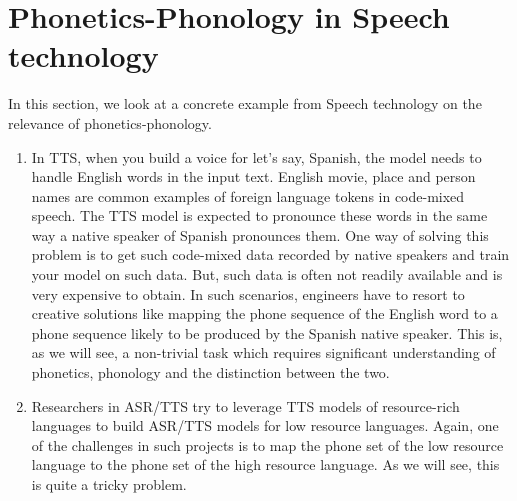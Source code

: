 \documentclass{article}
\begin{document}
\section{Phonetics-Phonology in Speech technology}

In this section, we look at a concrete example from Speech technology on the relevance of phonetics-phonology.
\begin{enumerate}
    \item In TTS, when you build a voice for let's say, Spanish, the model needs to handle English words in the input text. English movie, place and person names are common examples of foreign language tokens in code-mixed speech. The TTS model is expected to pronounce these words in the same way a native speaker of Spanish pronounces them. One way of solving this problem is to get such code-mixed data recorded by native speakers and train your model on such data. But, such data is often not readily available and is very expensive to obtain. In such scenarios, engineers have to resort to creative solutions like mapping the phone sequence of the English word to a phone sequence likely to be produced by the Spanish native speaker. This is, as we will see, a non-trivial task which requires significant understanding of phonetics, phonology and the distinction between the two.
    \item Researchers in ASR/TTS try to leverage TTS models of resource-rich languages to build ASR/TTS models for low resource languages. Again, one of the challenges in such projects is to map the phone set of the low resource language to the phone set of the high resource language. As we will see, this is quite a tricky problem. 
\end{enumerate}
   
\end{document}
